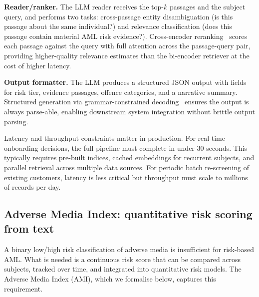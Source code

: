 \textbf{Reader/ranker.} The LLM reader receives the top-$k$ passages and the subject query, and performs two tasks: cross-passage entity disambiguation (is this passage about the same individual?) and relevance classification (does this passage contain material AML risk evidence?). Cross-encoder reranking~\cite{reimers2019} scores each passage against the query with full attention across the passage-query pair, providing higher-quality relevance estimates than the bi-encoder retriever at the cost of higher latency.

\textbf{Output formatter.} The LLM produces a structured JSON output with fields for risk tier, evidence passages, offence categories, and a narrative summary. Structured generation via grammar-constrained decoding~\cite{willard2023efficient} ensures the output is always parse-able, enabling downstream system integration without brittle output parsing.

\begin{remark}
Latency and throughput constraints matter in production. For real-time onboarding decisions, the full pipeline must complete in under 30 seconds. This typically requires pre-built indices, cached embeddings for recurrent subjects, and parallel retrieval across multiple data sources. For periodic batch re-screening of existing customers, latency is less critical but throughput must scale to millions of records per day.
\end{remark}

\subsection{Adverse Media Index: quantitative risk scoring from text}
\label{sec:ch11-adverse-media-index}

A binary low/high risk classification of adverse media is insufficient for risk-based AML. What is needed is a continuous risk score that can be compared across subjects, tracked over time, and integrated into quantitative risk models. The Adverse Media Index (AMI), which we formalise below, captures this requirement.

